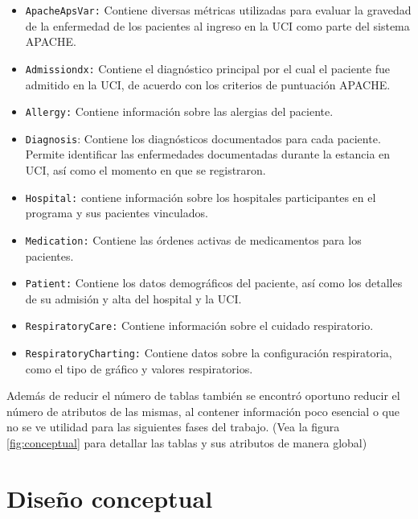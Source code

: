 \documentclass[12pt, a4paper, twoside]{article}
\begin{document}
	\begin{itemize}
		\item \texttt{ApacheApsVar:} Contiene diversas métricas utilizadas para evaluar la gravedad de la enfermedad de los pacientes al ingreso en la UCI como parte del sistema APACHE.
		
		\item \texttt{Admissiondx:} Contiene el diagnóstico principal por el cual el paciente fue admitido en la UCI, de acuerdo con los criterios de puntuación APACHE.
		
		\item \texttt{Allergy:} Contiene información sobre las alergias del paciente.
		
		\item \texttt{Diagnosis}: Contiene los diagnósticos documentados para cada paciente. Permite identificar las enfermedades documentadas durante la estancia en UCI, así como el momento en que se registraron.
		
		\item \texttt{Hospital:} contiene información sobre los hospitales participantes en el programa y sus pacientes vinculados.
		
		\item \texttt{Medication:} Contiene las órdenes activas de medicamentos para los pacientes.
		
		\item \texttt{Patient:} Contiene los datos demográficos del paciente, así como los detalles de su admisión y alta del hospital y la UCI.
				
		
		\item \texttt{RespiratoryCare:} Contiene información sobre el cuidado respiratorio.

		\item \texttt{RespiratoryCharting:} Contiene datos sobre la configuración respiratoria, como el tipo de gráfico y valores respiratorios.


	\end{itemize}

	
	
	Además de reducir el número de tablas también se encontró oportuno reducir el número de atributos de las mismas, al contener información poco esencial o que no se ve utilidad para las siguientes fases del trabajo. (Vea la figura \ref{fig:conceptual} para detallar las tablas y sus atributos de manera global)
	
	
	
	\section{Diseño conceptual}
	
\end{document}
